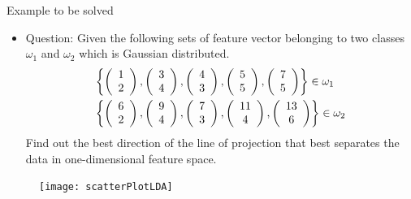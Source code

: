 \begin{frame}{Example to be solved}
\begin{footnotesize}
\begin{itemize}
\item[] {\color{mycolor2}Question}: Given the following sets of feature vector belonging to two classes $\omega_1$ and $\omega_2$ which is Gaussian distributed.
$$\begin{gathered}
  \left\{ {\left( {\begin{array}{*{20}{c}}
  1 \\ 
  2 
\end{array}} \right),\left( {\begin{array}{*{20}{c}}
  3 \\ 
  4 
\end{array}} \right),\left( {\begin{array}{*{20}{c}}
  4 \\ 
  3 
\end{array}} \right),\left( {\begin{array}{*{20}{c}}
  5 \\ 
  5 
\end{array}} \right),\left( {\begin{array}{*{20}{c}}
  7 \\ 
  5 
\end{array}} \right)} \right\} \in {\omega _1} \hfill \\
  \left\{ {\left( {\begin{array}{*{20}{c}}
  6 \\ 
  2 
\end{array}} \right),\left( {\begin{array}{*{20}{c}}
  9 \\ 
  4 
\end{array}} \right),\left( {\begin{array}{*{20}{c}}
  {7} \\ 
  3 
\end{array}} \right),\left( {\begin{array}{*{20}{c}}
  {11} \\ 
  4 
\end{array}} \right),\left( {\begin{array}{*{20}{c}}
  {13} \\ 
  6 
\end{array}} \right)} \right\} \in {\omega _2} \hfill \\ 
\end{gathered} $$
Find out the best direction of the line of projection that best separates the data in one-dimensional feature space.\\
\end{itemize}
\end{footnotesize}
\vspace{-16pt}
\begin{figure}
\texttt{[image: scatterPlotLDA]}
\end{figure}
\end{frame}

